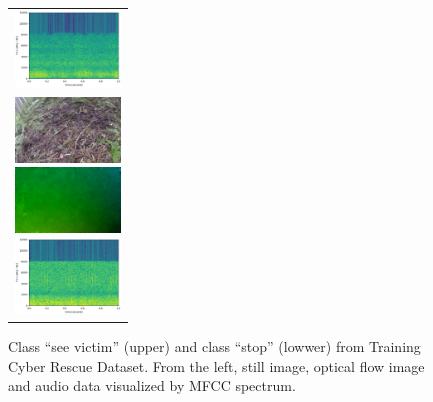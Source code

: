 \documentclass[MIRU,submit,english]{miru2019e}
\begin{document}
\begin{figure}[tb]
\begin{tabular}{l}
      \begin{minipage}{0.32\hsize}
        \begin{center}
          \includegraphics[clip, width=2.8cm]{./Figures/sound_seevictim.eps}
        \end{center}
      \end{minipage}
\\  %
      \begin{minipage}{0.32\hsize}
        \begin{center}
          \includegraphics[clip, width=2.8cm]{./Figures/still_stop1-3.eps}
        \end{center}
      \end{minipage}
      \begin{minipage}{0.32\hsize}
        \begin{center}
          \includegraphics[clip, width=2.8cm]{./Figures/optic_stop1-3.eps}
        \end{center}
      \end{minipage}
      \begin{minipage}{0.32\hsize}
        \begin{center}
          \includegraphics[clip, width=2.8cm]{./Figures/sound_stop2.eps}
        \end{center}
      \end{minipage}
    \end{tabular}
    \caption{Class ``see victim'' (upper) and class ``stop'' (lowwer) from Training Cyber Rescue Dataset. From the left, still image, optical flow image and audio data visualized by MFCC spectrum.}
    \label{dataset}
\end{figure}
\end{document}
